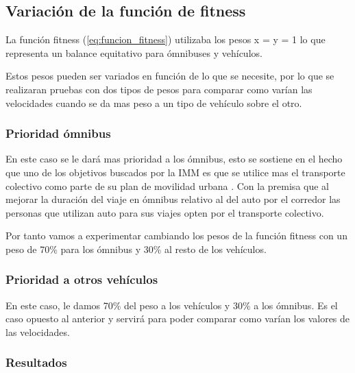 \subsection{Variación de la función de fitness}

La función fitness (\ref{eq:funcion_fitness}) utilizaba los pesos x = y = 1 lo que representa un balance equitativo  para ómnibuses y vehículos.


Estos pesos pueden ser variados en función de lo que se necesite, por lo que se realizaran pruebas con dos tipos de pesos para comparar como varían las velocidades cuando se da mas peso a un tipo de vehículo sobre el otro.


\subsubsection{Prioridad ómnibus}
En este caso se le dará mas prioridad a los ómnibus, esto se sostiene en el hecho que uno de los objetivos buscados por la IMM  es que se utilice mas el transporte colectivo como parte de su plan de movilidad urbana \citep{PlanMovilidad}. Con la premisa que al mejorar la duración del viaje en ómnibus relativo al del auto por el corredor las personas que utilizan auto para sus viajes opten por el transporte colectivo.

Por tanto vamos a experimentar cambiando los pesos de la función fitness con un peso de 70\% para los ómnibus y 30\% al resto de los vehículos.


\subsubsection{Prioridad a otros vehículos}

En este caso, le damos 70\% del peso a los vehículos y 30\% a los ómnibus. Es el caso opuesto al anterior y servirá para poder comparar como varían los valores de las velocidades.

\subsubsection{Resultados}

